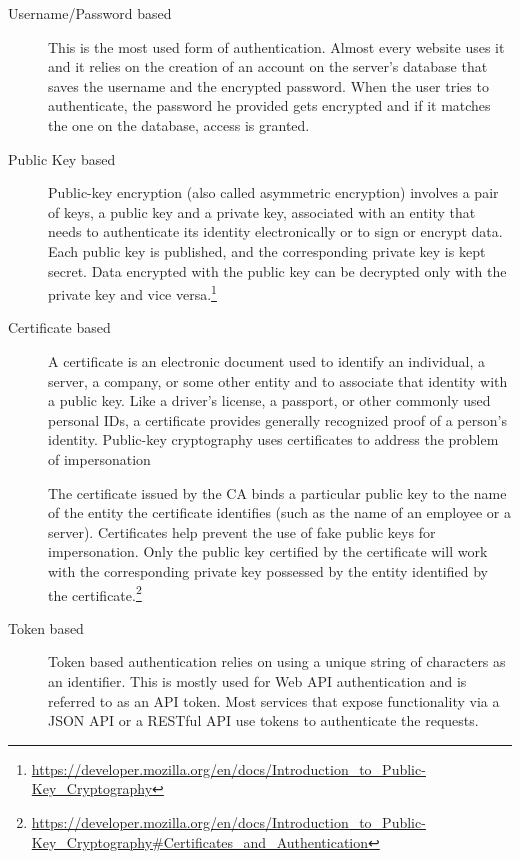 \begin{description}
\item[Username/Password based] This is the most used form of authentication. Almost every website uses it and it relies on the creation of an account on the server's database that saves the username and the encrypted password. When the user tries to authenticate, the password he provided gets encrypted and if it matches the one on the database, access is granted.

\item[Public Key based] Public-key encryption (also called asymmetric encryption) involves a pair of keys, a public key and a private key, associated with an entity that needs to authenticate its identity electronically or to sign or encrypt data. Each public key is published, and the corresponding private key is kept secret. Data encrypted with the public key can be decrypted only with the private key and vice versa.\footnote{\url{https://developer.mozilla.org/en/docs/Introduction_to_Public-Key_Cryptography}} 

\item[Certificate based] A certificate is an electronic document used to identify an individual, a server, a company, or some other entity and to associate that identity with a public key. Like a driver's license, a passport, or other commonly used personal IDs, a certificate provides generally recognized proof of a person's identity. Public-key cryptography uses certificates to address the problem of impersonation

The certificate issued by the CA binds a particular public key to the name of the entity the certificate identifies (such as the name of an employee or a server). Certificates help prevent the use of fake public keys for impersonation. Only the public key certified by the certificate will work with the corresponding private key possessed by the entity identified by the certificate.\footnote{\url{https://developer.mozilla.org/en/docs/Introduction_to_Public-Key_Cryptography\#Certificates_and_Authentication}}

\item[Token based] Token based authentication relies on using a unique string of characters as an identifier. This is mostly used for Web \ac{API} authentication and is referred to as an \ac{API} token. Most services that expose functionality via a JSON API or a RESTful API use tokens to authenticate the requests.   
\end{description}
 


